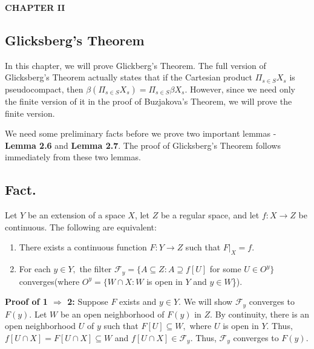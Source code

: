\documentclass{article}
\begin{document}
\begin{center}
\textbf{CHAPTER II}
\end{center}
\vskip 40pt
\begin{center}
\section{Glicksberg's Theorem}
\end{center}

\vskip 20pt

In this chapter, we will prove Glickberg's Theorem. The full version of Glicksberg's Theorem actually states that if the Cartesian product $\Pi_{s\in S} X_s$ is pseudocompact, then $\beta \left(\Pi_{s\in S} X_s\right) = \Pi_{s\in S} \beta X_s.$ However, since we need only the finite version of it in the proof of Buzjakova's Theorem, we will prove the finite version. 

\vskip 20pt
We  need some preliminary facts before we prove two important lemmas - \textbf{Lemma 2.6} and \textbf{Lemma 2.7}. The proof of Glicksberg's Theorem follows immediately from these two lemmas.


\vskip 25pt

\subsection{Fact.}  Let $Y$ be an extension of a space $X$, let $Z$ be a regular space, and let $f:X \rightarrow Z$ be continuous. The following are equivalent: 
\begin{enumerate}
	\item There exists a continuous function $F: Y\rightarrow Z$ such that $F|_X=f.$
	\item For each $y\in Y,$ the filter $\mathcal{F}_y=\{A\subseteq Z: A\supseteq f[U]$ for some $U\in O^y\}$ converges(where $O^y=\{W\cap X: W$ is open in $Y$ and $y\in W$\}).

\end{enumerate}

\vskip 15pt


\textbf{Proof of 1 $\Rightarrow$ 2: } Suppose $F$ exists and $y\in Y$. We will show $\mathcal{F}_y$ converges to $F(y).$ Let $W$ be an open neighborhood of $F(y)$ in $Z$. By continuity, there is an open neighborhood $U$ of $y$ such that $F[U]\subseteq W,$ where $U$ is open in $Y$. Thus, $f\left[U\cap X\right]=F\left[U\cap X\right] \subseteq W$ and $f\left[U\cap X\right]\in \mathcal{F}_y$. Thus, $\mathcal{F}_y$ converges to $F(y)$.
\end{document}
